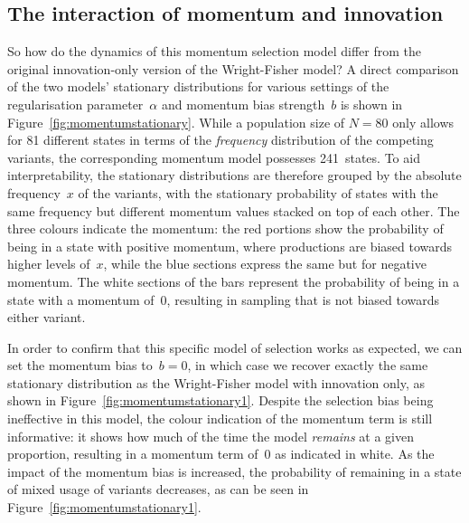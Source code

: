 \subsection{The interaction of momentum and innovation}

So how do the dynamics of this momentum selection model differ from the original innovation-only version of the Wright-Fisher model? A direct comparison of the two models' stationary distributions for various settings of the regularisation parameter~$\alpha$ and momentum bias strength~$b$ is shown in Figure~\ref{fig:momentumstationary}. While a population size of $N=80$ only allows for 81 different states in terms of the \emph{frequency} distribution of the competing variants, the corresponding momentum model possesses 241~states. To aid interpretability, the stationary distributions are therefore grouped by the absolute frequency~$x$ of the variants, with the stationary probability of states with the same frequency but different momentum values stacked on top of each other. The three colours indicate the momentum: the red portions show the probability of being in a state with positive momentum, where productions are biased towards higher levels of~$x$, while the blue sections express the same but for negative momentum. The white sections of the bars represent the probability of being in a state with a momentum of~$0$, resulting in sampling that is not biased towards either variant. %

In order to confirm that this specific model of selection works as expected, we can set the momentum bias to~$b=0$, in which case we recover exactly the same stationary distribution as the Wright-Fisher model with innovation only, as shown in Figure~\ref{fig:momentumstationary1}.
Despite the selection bias being ineffective in this model, the colour indication of the momentum term is still informative: it shows how much of the time the model \emph{remains} at a given proportion, resulting in a momentum term of~$0$ as indicated in white. As the impact of the momentum bias is increased, the probability of remaining in a state of mixed usage of variants decreases, as can be seen in Figure~\ref{fig:momentumstationary1}.

